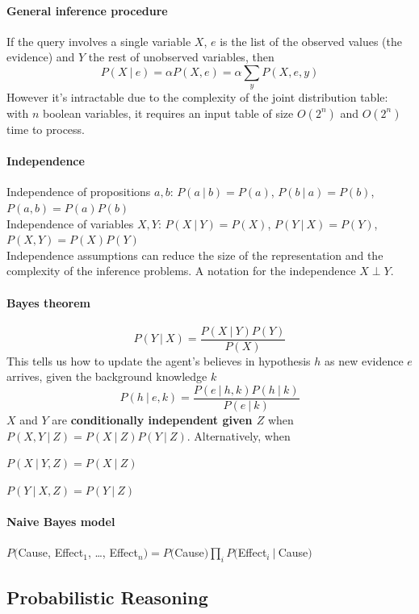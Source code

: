 \documentclass[10pt]{report}
\begin{document}
\paragraph{General inference procedure} If the query involves a single variable $X$, $e$ is the list of the observed values (the evidence) and $Y$ the rest of unobserved variables, then $$P(X\:|\:e) = \alpha P(X,e) = \alpha\sum_y P(X,e,y)$$
However it's intractable due to the complexity of the joint distribution table: with $n$ boolean variables, it requires an input table of size $O(2^n)$ and $O(2^n)$ time to process.
\paragraph{Independence} Independence of propositions $a,b$: $P(a\:|\:b) = P(a)$, $P(b\:|\:a)=P(b)$, $P(a,b)=P(a)P(b)$\\
Independence of variables $X,Y$: $P(X\:|\:Y) = P(X)$, $P(Y\:|\:X)=P(Y)$, $P(X,Y)=P(X)P(Y)$\\
Independence assumptions can reduce the size of the representation and the complexity of the inference problems. A notation for the independence $X\perp Y$.
\paragraph{Bayes theorem} $$P(Y\:|\:X) = \frac{P(X\:|\:Y)P(Y)}{P(X)}$$
This tells us how to update the agent's believes in hypothesis $h$ as new evidence $e$ arrives, given the background knowledge $k$ $$P(h\:|\:e,k)=\frac{P(e\:|\:h,k)P(h\:|\:k)}{P(e\:|\:k)}$$
$X$ and $Y$ are \textbf{conditionally independent given $Z$} when $P(X,Y\:|\:Z)=P(X\:|\:Z)P(Y\:|\:Z)$. Alternatively, when \begin{list}{}{}
	\item $P(X\:|\:Y,Z) = P(X\:|\:Z)$
	\item $P(Y\:|\:X,Z) = P(Y\:|\:Z)$
\end{list}
\paragraph{Naive Bayes model} $P($Cause, Effect$_1$, \ldots, Effect$_n) = P($Cause$)\prod_i P($Effect$_i\:|\:$Cause$)$
\subsection{Probabilistic Reasoning} 
\end{document}
